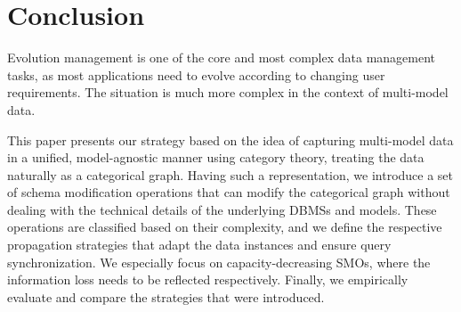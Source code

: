 




\section{Conclusion}
Evolution management is one of the core and most complex data management tasks, as most applications need to evolve according to changing user requirements. The situation is much more complex in the context of multi-model data.

This paper presents our strategy based on the idea of capturing multi-model data in a unified, model-agnostic manner using category theory, treating the data naturally as a categorical graph. Having such a representation, we introduce a set of schema modification operations that can modify the categorical graph without dealing with the technical details of the underlying DBMSs and models. These operations are classified based on their complexity, and we define the respective propagation strategies that adapt the data instances and ensure query synchronization. We especially focus on capacity-decreasing SMOs, where the information loss needs to be reflected respectively. Finally, we empirically evaluate and compare the strategies that were introduced.


